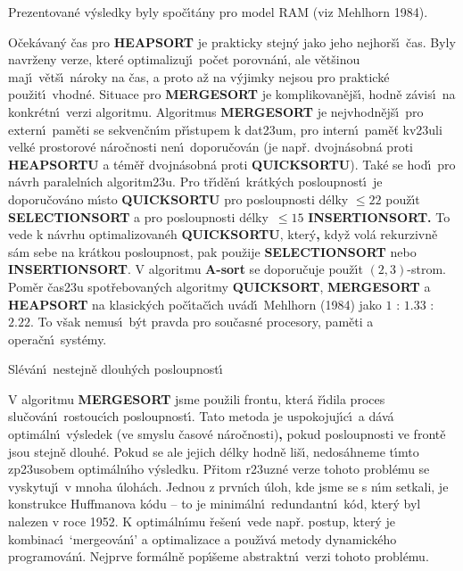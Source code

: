 \documentclass[a4paper,12pt]{article}
\begin{document}
\flushpar Prezentovan\'e  v\'ysledky byly spo\v c\'\i t\'any 
pro model RAM (viz Mehlhorn 1984).
\medskip

\flushpar O\v cek\'avan\'y \v cas pro {\bf HEAPSORT} je prakticky stejn\'y jako 
jeho nej\-hor\v s\'\i\ \v cas.  Byly navr\v zeny verze, kter\'e optimalizuj\'\i\ 
po\v cet porov\-n\'an\'\i , ale v\v et\v sinou maj\'\i\ v\v et\v s\'\i\ n\'aroky na 
\v cas, a proto a\v z na v\'yjimky ne\-jsou pro praktick\'e 
pou\v zit\'\i\ vhodn\'e.  
Situace pro {\bf MERGESORT} je komplikovan\v ej\v s\'\i , hod\-n\v e z\'avis\'\i\ 
na konkr\'etn\'\i\ verzi algoritmu.  Algoritmus 
{\bf MER\-GE\-SORT} je nejvhodn\v ej\v s\'\i\ pro extern\'\i\ pam\v eti se  
sekven\v cn\'\i m p\v r\'\i stupem k dat\accent23um, pro intern\'\i\ 
pam\v e\v t kv\accent23uli velk\'e prostorov\'e n\'aro\v cnosti 
nen\'\i\ doporu\v cov\'an (je nap\v r. dvojn\'asobn\'a proti {\bf HEAPSORTU }
a t\'em\v e\v r dvojn\'asobn\'a proti {\bf QUICKSORTU}). Tak\'e se hod\'\i\ pro 
n\'avrh pa\-ra\-leln\'\i ch algoritm\accent23u. Pro t\v r\'\i d\v en\'\i\ 
kr\'atk\'ych posloupnost\'\i\ je doporu\v cov\'ano m\'\i sto {\bf QUICKSORTU }
pro posloupnosti d\'elky $\le 22$ pou\v z\'\i t {\bf SELECTIONSORT} a pro 
posloupnosti d\'elky $\,\le 15$  {\bf INSERTIONSORT.}
To vede k n\'avrhu optimalizovan\'eh {\bf QUICKSORTU}, 
kter\'y{\bf ,}  kdy\v z 
vol\'a rekurzivn\v e s\'am sebe na kr\'atkou posloupnost, pak 
pou\v zije {\bf SELECTIONSORT} ne\-bo {\bf INSERTIONSORT}. V algoritmu {\bf A-sort }
se doporu\-\v cu\-je pou\v z\'\i t $(2,3)$-strom.  
Pom\v er \v cas\accent23u spot\v rebovan\'ych  
algoritmy {\bf QUICKSORT},  {\bf MERGESORT} a {\bf HEAPSORT} na 
klasick\'ych po\v c\'\i ta\v c\'\i ch uv\'ad\'\i\ Mehlhorn (1984) jako  
$1$ : $1.33$ : $2.22$. To 
v\v sak nemus\'\i\  b\'yt pravda pro sou\v casn\'e procesory, 
pam\v eti a opera\v cn\'\i\ syst\'emy. 
\bigskip

\head
Sl\'ev\'an\'\i\ nestejn\v e dlouh\'ych posloupnost\'\i
\endhead

\flushpar V algoritmu {\bf MERGESORT} jsme pou\v zili frontu, kter\'a 
\v r\'\i dila proces slu\v cov\'an\'\i\ rostouc\'\i ch posloupnost\'\i .  Tato metoda je uspokojuj\'\i c\'\i\ a 
d\'av\'a optim\'aln\'\i\ v\'ysledek (ve smyslu \v casov\'e n\'aro\v cnosti){\bf ,} pokud posloupnosti ve front\v e jsou 
stejn\v e dlouh\'e.  Pokud se ale jejich d\'elky hodn\v e li\v s\'\i , 
nedos\'ahneme t\'\i mto zp\accent23usobem  
optim\'aln\'\i ho v\'ysledku.  P\v ritom r\accent23uzn\'e verze tohoto 
probl\'emu se vyskytuj\'\i\ v mnoha \'uloh\'ach. Jednou z prvn\'\i ch \'uloh, 
kde jsme se s n\'\i m setkali, je konstrukce 
Huffmanova k\'odu -- to je minim\'aln\'\i\ redundantn\'\i\ k\'od, kter\'y byl 
nalezen v roce 1952. K optim\'aln\'\i mu \v re\v sen\'\i\ vede nap\v r. 
postup, kter\'y je kombinac\'\i\ `mergeov\'an\'\i ' a 
optimalizace a pou\v z\'\i v\'a metody dynamick\'eho programov\'an\'\i .  
Nejprve form\'aln\v e pop\'\i\v seme abstraktn\'\i\ verzi tohoto probl\'emu.  
\medskip
\end{document}
